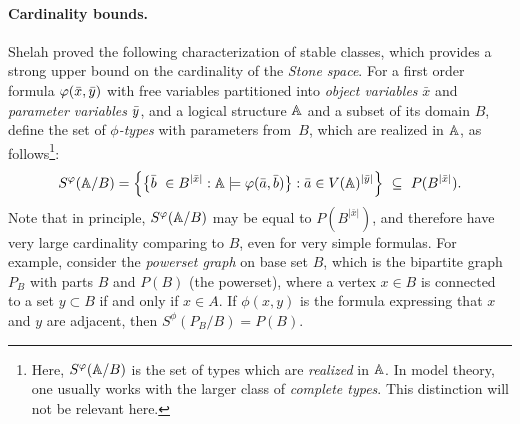 \paragraph{Cardinality bounds.}
Shelah proved the following characterization of stable classes, which provides a strong upper bound on the cardinality of the \emph{Stone space}.
For a first order formula $\varphi(\bar{x},\bar{y})$ 
with free variables partitioned into  \emph{object variables} $\bar x$ and \emph{parameter variables} $\bar{y}$, and a logical structure $\mathbb A$
and a subset of its domain $B$, define
%
the set of \emph{$\phi$-types} with parameters from~$B$, which are realized in 
$\mathbb{A}$, as follows\footnote{Here, $S^\varphi(\mathbb A/B)$ is the set  of types which are \emph{realized} in $\mathbb A$. In model theory,
one usually works with the larger class of \emph{complete types}. This distinction will not be relevant here.}:
\[S^\varphi(\mathbb{A}/B)=\left\{\big\{\bar{b}\ \in B^{|\bar x|} : \mathbb{A}\models\varphi(\bar{a},\bar{b})\big\} : \bar{a}\in V(\mathbb{A})^{|\bar y|}\right\}\ \subseteq\  P(B^{|\bar x|}).\]
Note that in principle, $S^\varphi(\mathbb A/B)$
may be equal to $P(B^{|\bar x|})$, and therefore have very large cardinality comparing to $B$, even for very simple formulas. For example, consider the \emph{powerset graph} on base set $B$, which is the bipartite graph $P_B$  with parts $B$ and $P(B)$ (the powerset), where a vertex $x\in B$
is connected to a set $y\subset B$ if and only if $x\in A$.
If $\phi(x,y)$ is the formula expressing that $x$ and $y$ are adjacent, then $S^\phi(P_B/B)=P(B)$.




